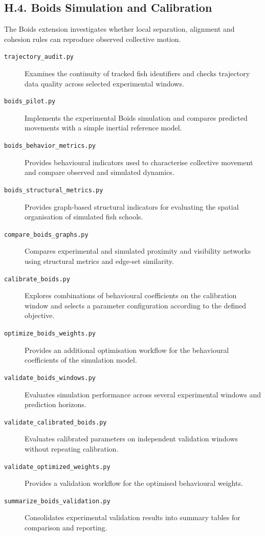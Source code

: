\documentclass[10pt,a4paper]{article}
\begin{document}
\subsection*{H.4. Boids Simulation and Calibration}

The Boids extension investigates whether local
separation, alignment and cohesion rules can
reproduce observed collective motion.

\begin{description}

\item[\texttt{trajectory\_audit.py}]
Examines the continuity of tracked fish identifiers
and checks trajectory data quality across selected
experimental windows.

\item[\texttt{boids\_pilot.py}]
Implements the experimental Boids simulation
and compares predicted movements with a simple
inertial reference model.

\item[\texttt{boids\_behavior\_metrics.py}]
Provides behavioural indicators used to
characterise collective movement and compare
observed and simulated dynamics.

\item[\texttt{boids\_structural\_metrics.py}]
Provides graph-based structural indicators for
evaluating the spatial organisation of simulated
fish schools.

\item[\texttt{compare\_boids\_graphs.py}]
Compares experimental and simulated proximity
and visibility networks using structural metrics
and edge-set similarity.

\item[\texttt{calibrate\_boids.py}]
Explores combinations of behavioural coefficients
on the calibration window and selects a parameter
configuration according to the defined objective.

\item[\texttt{optimize\_boids\_weights.py}]
Provides an additional optimisation workflow
for the behavioural coefficients of the
simulation model.

\item[\texttt{validate\_boids\_windows.py}]
Evaluates simulation performance across several
experimental windows and prediction horizons.

\item[\texttt{validate\_calibrated\_boids.py}]
Evaluates calibrated parameters on independent
validation windows without repeating calibration.

\item[\texttt{validate\_optimized\_weights.py}]
Provides a validation workflow for the optimised
behavioural weights.

\item[\texttt{summarize\_boids\_validation.py}]
Consolidates experimental validation results
into summary tables for comparison and reporting.

\end{description}
\end{document}
